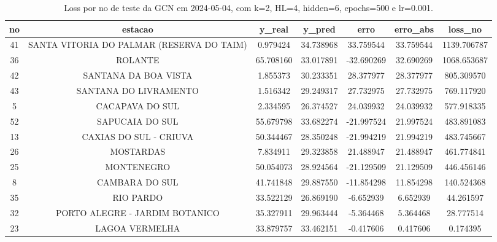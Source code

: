 \begin{table}[h]
\centering
\caption{Loss por no de teste da GCN em 2024-05-04, com k=2, HL=4, hidden=6, epochs=500 e lr=0.001.}
\label{tab:gcn_loss_k2_hl4_h6_e500_d20240504}
\begin{tabular}{ccccccc}
\toprule
no & estacao & y\_real & y\_pred & erro & erro\_abs & loss\_no \\
\midrule
41 & SANTA VITORIA DO PALMAR (RESERVA DO TAIM) & 0.979424 & 34.738968 & 33.759544 & 33.759544 & 1139.706787 \\
36 & ROLANTE & 65.708160 & 33.017891 & -32.690269 & 32.690269 & 1068.653687 \\
42 & SANTANA DA BOA VISTA & 1.855373 & 30.233351 & 28.377977 & 28.377977 & 805.309570 \\
43 & SANTANA DO LIVRAMENTO & 1.516342 & 29.249317 & 27.732975 & 27.732975 & 769.117920 \\
5 & CACAPAVA DO SUL & 2.334595 & 26.374527 & 24.039932 & 24.039932 & 577.918335 \\
52 & SAPUCAIA DO SUL & 55.679798 & 33.682274 & -21.997524 & 21.997524 & 483.891083 \\
13 & CAXIAS DO SUL - CRIUVA & 50.344467 & 28.350248 & -21.994219 & 21.994219 & 483.745667 \\
26 & MOSTARDAS & 7.834911 & 29.323858 & 21.488947 & 21.488947 & 461.774841 \\
25 & MONTENEGRO & 50.054073 & 28.924564 & -21.129509 & 21.129509 & 446.456146 \\
8 & CAMBARA DO SUL & 41.741848 & 29.887550 & -11.854298 & 11.854298 & 140.524368 \\
35 & RIO PARDO & 33.522129 & 26.869190 & -6.652939 & 6.652939 & 44.261597 \\
32 & PORTO ALEGRE - JARDIM BOTANICO & 35.327911 & 29.963444 & -5.364468 & 5.364468 & 28.777514 \\
23 & LAGOA VERMELHA & 33.879757 & 33.462151 & -0.417606 & 0.417606 & 0.174395 \\
\bottomrule
\end{tabular}
\end{table}
